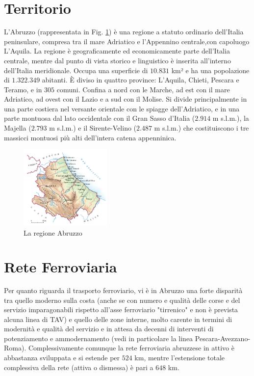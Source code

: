 \section{Territorio}
L'Abruzzo (rappresentata in Fig. \ref{fig:regioneAbruzzo}) è una regione a statuto ordinario dell'Italia peninsulare, compresa tra il mare Adriatico e l'Appennino centrale,con capoluogo L'Aquila. La regione è geograficamente ed economicamente parte dell'Italia centrale, mentre dal punto di vista storico e linguistico è inserita all'interno dell'Italia meridionale.
\newline
Occupa una superficie di $10.831$ km² e ha una popolazione di $1.322.349$ abitanti. È diviso in quattro province: L'Aquila, Chieti, Pescara e Teramo, e in $305$ comuni. Confina a nord con le Marche, ad est con il mare Adriatico, ad ovest con il Lazio e a sud con il Molise. Si divide principalmente in una parte costiera nel versante orientale con le spiagge dell'Adriatico, e in una parte montuosa dal lato occidentale con il Gran Sasso d'Italia ($2.914$ m s.l.m.), la Majella ($2.793$ m s.l.m.) e il Sirente-Velino ($2.487$ m s.l.m.) che costituiscono i tre massicci montuosi più alti dell'intera catena appenninica.
\newpage
\begin{figure}[bht]
	\centering
	\includegraphics[width=0.4\textwidth]{img/regione}
	\caption{La regione Abruzzo}
    \label{fig:regioneAbruzzo}
\end{figure}

\section{Rete Ferroviaria}
Per quanto riguarda il trasporto ferroviario, vi è in Abruzzo una forte disparità tra quello moderno sulla costa (anche se con numero e qualità delle corse e del servizio imparagonabili rispetto all'asse ferroviario "tirrenico" e non è prevista alcuna linea di TAV) e quello delle zone interne, molto carente in termini di modernità e qualità del servizio e in attesa da decenni di interventi di potenziamento e ammodernamento (vedi in particolare la linea Pescara-Avezzano-Roma). Complessivamente comunque la rete ferroviaria abruzzese in attivo è abbastanza sviluppata e si estende per $524$ km, mentre l'estensione totale complessiva della rete (attiva o dismessa) è pari a $648$ km.

